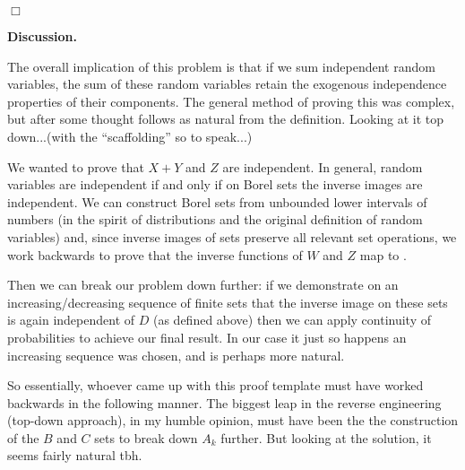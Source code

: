 \documentclass{article}
\begin{document}
\hfill $\Box$

\bigskip

\noindent \textbf{Discussion.} 

\smallskip

The overall implication of this problem is that if we sum independent random variables, the sum of these random variables retain the exogenous independence properties of their components. The general method of proving this was complex, but after some thought follows as natural from the definition. Looking at it top down...(with the ``scaffolding'' so to speak...)

We wanted to prove that $X + Y$ and $Z$ are independent. In general, random variables are independent if and only if on Borel sets the inverse images are independent. We can construct Borel sets from unbounded lower intervals of numbers (in the spirit of distributions and the original definition of random variables) and, since inverse images of sets preserve all relevant set operations, we work backwards to prove that the inverse functions of $W$ and $Z$ map to .

Then we can break our problem down further: if we demonstrate on an increasing/decreasing sequence of finite sets that the inverse image on these sets is again independent of $D$ (as defined above) then we can apply continuity of probabilities to achieve our final result. In our case it just so happens an increasing sequence was chosen, and is perhaps more natural. 

So essentially, whoever came up with this proof template must have worked backwards in the following manner. The biggest leap in the reverse engineering (top-down approach), in my humble opinion, must have been the the construction of the $B$ and $C$ sets to break down $A_k$ further. But looking at the solution, it seems fairly natural tbh. 
\end{document}
